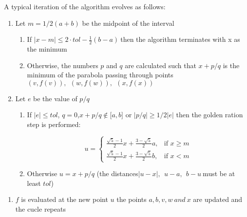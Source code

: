 A typical iteration of the algorithm evolves as follows:


\begin{enumerate}
\def\labelenumi{\arabic{enumi}.}
\item
  Let $m = 1\text{/}2(a + b)$ be the midpoint of the interval

  \begin{enumerate}
  \def\labelenumii{\alph{enumii}.}
  \item
    If $|x - m| \leq 2 \cdot tol - \frac{1}{2}(b - a)\ $then the
    algorithm terminates with x as the minimum
  \item
    Otherwise, the numbers $p$ and $q$ are calculated such that
    $x + p/q$ is the minimum of the parabola passing through
    points\\
    $\left( v,f(v) \right),\ \ \left( w,f(w) \right),\ \ \left( x,f(x) \right)$
  \end{enumerate}
\item
  Let $e$ be the value of $p/q$

  \begin{enumerate}
  \def\labelenumii{\alph{enumii}.}
  \item
    If $|e| \leq tol$,
    $q = 0$,$x + p\text{/}q \notin \lbrack a,b\rbrack$ or
    $\left| p\text{/}q \right| \geq 1/2|e|$ then the golden ration
    step is performed:
  



\begin{equation}
  u =
  \begin{cases} 
  \frac{\sqrt{5} - 1}{2}x + \frac{3 - \sqrt{5}}{2}a, & \text{if } x \geq m \\ 
  \frac{\sqrt{5} - 1}{2}x + \frac{3 - \sqrt{5}}{2}b, & \text{if } x < m
  \end{cases}
\end{equation}

\item
  Otherwise $u = x + p\text{/}q$ (the
  distances$|u - x|,\ \ u - a,\ \ b - u\ $must be at least $tol$)
\end{enumerate}
\end{enumerate}


\begin{enumerate}
\def\labelenumi{\arabic{enumi}.}
\setcounter{enumi}{2}
\item
  $f$ is evaluated at the new point $u$ the points
  $a,b,v,w\ and\ x$ are updated and the cucle repeats
\end{enumerate}

